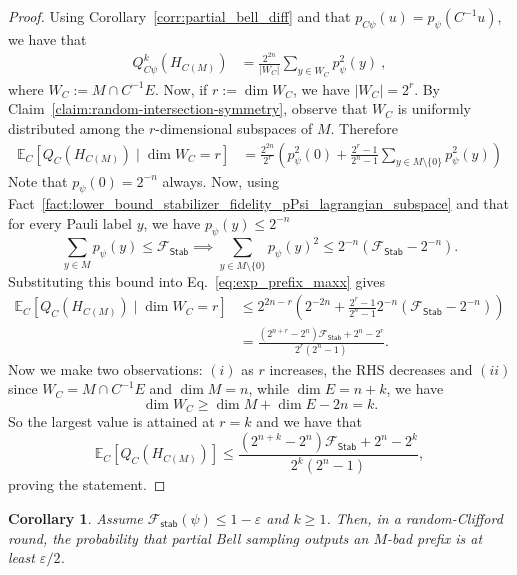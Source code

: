 \documentclass[11pt]{article}
\newtheorem{corollary}[theorem]{Corollary}
\newcommand{\Sh}{\ensuremath{\textsf{Stab}}}
\newcommand{\Fe}{\ensuremath{\mathcal{F}}}
\begin{document}
\begin{proof}
Using Corollary~\ref{corr:partial_bell_diff} and that $p_{C\psi}(u) = p_\psi(C^{-1}u)$, we have that
\begin{align}
    Q_{C\psi}^k(H_{C(M)}) & = \frac{2^{2n}}{\vert W_C\vert} \sum_{y \in W_C}p_\psi^2(y)\ ,
\end{align}
where
$ W_C:=M\cap C^{-1}E.$ Now, if
$    r:=\dim W_C$, we have $|W_C|=2^r$. By
Claim~\ref{claim:random-intersection-symmetry}, observe that $W_C$ is uniformly
distributed among the $r$-dimensional subspaces of $M$.  Therefore
\begin{align}
    \mathbb E_C\!\left[
        Q_C(H_{C(M)})\mid \dim W_C=r
    \right]
    &=
    \frac{2^{2n}}{2^r}
    \left(
        p_\psi^2(0)
        +
        \frac{2^r-1}{2^n-1}
        \sum_{y\in M\setminus\{0\}}p_\psi^2(y)
    \right)\label{eq:exp_prefix_maxx}
\end{align}
Note that $p_\psi(0) = 2^{-n}$ always. Now, using Fact~\ref{fact:lower_bound_stabilizer_fidelity_pPsi_lagrangian_subspace} and that for every Pauli label $y$, we have $p_\psi(y)\le 2^{-n}$
$$
    \sum_{y\in M}p_\psi(y)\le \Fe_{\Sh}
\implies
    \sum_{y\in M\setminus\{0\}}p_\psi(y)^2
    \le
    2^{-n}\left(\Fe_{\Sh}-2^{-n}\right).
$$
Substituting this bound into Eq.~\eqref{eq:exp_prefix_maxx} gives
$$
\begin{aligned}
    \mathbb E_C\!\left[
        Q_C(H_{C(M)})\mid \dim W_C=r
    \right]
    &\le
    2^{2n-r}
    \left(
        2^{-2n}
        +
        \frac{2^r-1}{2^n-1}
        2^{-n}(\Fe_{\Sh}-2^{-n})
    \right) \\
    &=
    \frac{(2^{n+r}-2^n)\Fe_{\Sh}+2^n-2^r}
         {2^r(2^n-1)}.
\end{aligned}
$$
Now we make two observations: $(i)$ as $r$ increases, the RHS decreases and $(ii)$ since
$ W_C=M\cap C^{-1}E$ and $\dim M=n$, while $\dim E=n+k$, we have
$$
    \dim W_C
    \ge
    \dim M+\dim E-2n
    =
    k.
$$
So the largest value is attained at $r=k$ and we have that
$$
    \mathbb E_C[Q_C(H_{C(M)})]
    \le
    \frac{(2^{n+k}-2^n)\Fe_{\Sh}+2^n-2^k}{2^k(2^n-1)},
$$
proving the statement.
\end{proof}
\begin{corollary}
\label{cor:bad-prefix-probability}
Assume $\Fe_{\textsf{stab}}(\psi)\le 1-\varepsilon$ and $k\geq 1$.  Then, in a random-Clifford
round, the probability that partial Bell sampling outputs an $M$-bad prefix is
at least $\varepsilon/2$.
\end{corollary}
\end{document}
